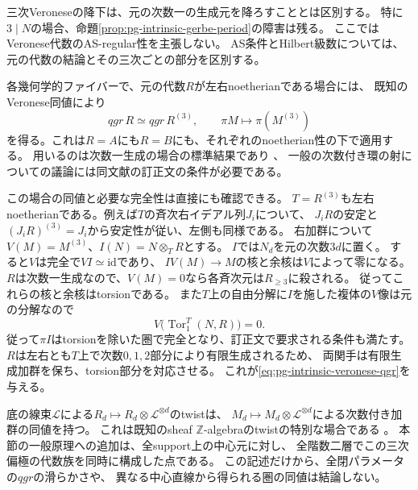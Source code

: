 \begin{remark}[Veroneseと射影的な圏の範囲]
\label{rem:pg-intrinsic-veronese-qgr}
三次Veroneseの降下は、元の次数一の生成元を降ろすこととは区別する。
特に$3\mid N$の場合、命題\ref{prop:pg-intrinsic-gerbe-period}の障害は残る。
ここではVeronese代数のAS-regular性を主張しない。
AS条件とHilbert級数については、元の代数の結論とその三次ごとの部分を区別する。

各幾何学的ファイバーで、元の代数$R$が左右noetherianである場合には、
既知のVeronese同値により
\begin{equation}
 qgr\,R\simeq qgr\,R^{(3)},\qquad
 \pi M\longmapsto\pi(M^{(3)})
 \label{eq:pg-intrinsic-veronese-qgr}
\end{equation}
を得る。これは$R=A$にも$R=B$にも、それぞれのnoetherian性の下で適用する。
用いるのは次数一生成の場合の標準結果であり
\cite[Theorem~4.1, Proposition~4.8, pp.~2934, 2940--2941]{PSmithVeronese}、
一般の次数付き環の射についての議論には同文献の訂正文の条件が必要である。

この場合の同値と必要な完全性は直接にも確認できる。
$T=R^{(3)}$も左右noetherianである。例えば$T$の斉次右イデアル列$J_i$について、
$J_iR$の安定と$(J_iR)^{(3)}=J_i$から安定性が従い、左側も同様である。
右加群について
$V(M)=M^{(3)}$、$I(N)=N\otimes_T R$とする。
$I$では$N_d$を元の次数$3d$に置く。
すると$V$は完全で$VI\simeq\mathrm{id}$であり、
$IV(M)\to M$の核と余核は$V$によって零になる。
$R$は次数一生成なので、$V(M)=0$なら各斉次元は$R_{\ge3}$に殺される。
従ってこれらの核と余核はtorsionである。
また$T$上の自由分解に$I$を施した複体の$V$像は元の分解なので
\begin{equation}
 V\bigl(\operatorname{Tor}^T_1(N,R)\bigr)=0.
 \label{eq:pg-intrinsic-veronese-tor}
\end{equation}
従って$\pi I$はtorsionを除いた圏で完全となり、訂正文で要求される条件も満たす。
$R$は左右とも$T$上で次数$0,1,2$部分により有限生成されるため、
両関手は有限生成加群を保ち、torsion部分を対応させる。
これが\eqref{eq:pg-intrinsic-veronese-qgr}を与える。

底の線束$\mathcal L$による$R_d\mapsto R_d\otimes\mathcal L^{\otimes d}$のtwistは、
$M_d\mapsto M_d\otimes\mathcal L^{\otimes d}$による次数付き加群の同値を持つ。
これは既知のsheaf $\mathbb Z$-algebraのtwistの特別な場合である
\cite[arXiv v3, \S4.2, p.~9]{PVdBNoncommP1Bundles}。
本節の一般原理への追加は、全support上の中心元に対し、
全階数二層でこの三次偏極の代数族を同時に構成した点である。
この記述だけから、全閉パラメータの$qgr$の滑らかさや、
異なる中心直線から得られる圏の同値は結論しない。
\end{remark}

